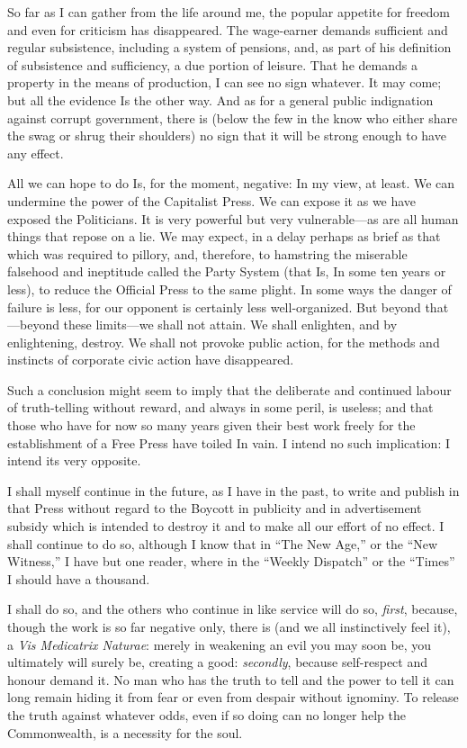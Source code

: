 \documentclass{book}
\begin{document}
So far as I can gather from the life around me, the popular appetite for freedom and even for criticism has disappeared. The wage-earner demands sufficient and regular subsistence, including a system of pensions, and, as part of his definition of subsistence and sufficiency, a due portion of leisure. That he demands a property in the means of production, I can see no sign whatever. It may come; but all the evidence Is the other way. And as for a general public indignation against corrupt government, there is (below the few in the know who either share the swag or shrug their shoulders) no sign that it will be strong enough to have any effect.

All we can hope to do Is, for the moment, negative: In my view, at least. We can undermine the power of the Capitalist Press. We can expose it as we have exposed the Politicians. It is very powerful but very vulnerable—as are all human things that repose on a lie. We may expect, in a delay perhaps as brief as that which was required to pillory, and, therefore, to hamstring the miserable falsehood and ineptitude called the Party System (that Is, In some ten years or less), to reduce the Official Press to the same plight. In some ways the danger of failure is less, for our opponent is certainly less well-organized. But beyond that—beyond these limits—we shall not attain. We shall enlighten, and by enlightening, destroy. We shall not provoke public action, for the methods and instincts of corporate civic action have disappeared.

Such a conclusion might seem to imply that the deliberate and continued labour of truth-telling without reward, and always in some peril, is useless; and that those who have for now so many years given their best work freely for the establishment of a Free Press have toiled In vain. I intend no such implication: I intend its very opposite.

I shall myself continue in the future, as I have in the past, to write and publish in that Press without regard to the Boycott in publicity and in advertisement subsidy which is intended to destroy it and to make all our effort of no effect. I shall continue to do so, although I know that in “The New Age,” or the “New Witness,” I have but one reader, where in the “Weekly Dispatch” or the “Times” I should have a thousand.

I shall do so, and the others who continue in like service will do so, \emph{first}, because, though the work is so far negative only, there is (and we all instinctively feel it), a \emph{Vis Medicatrix Naturae}: merely in weakening an evil you may soon be, you ultimately will surely be, creating a good: \emph{secondly}, because self-respect and honour demand it. No man who has the truth to tell and the power to tell it can long remain hiding it from fear or even from despair without ignominy. To release the truth against whatever odds, even if so doing can no longer help the Commonwealth, is a necessity for the soul.
\end{document}
